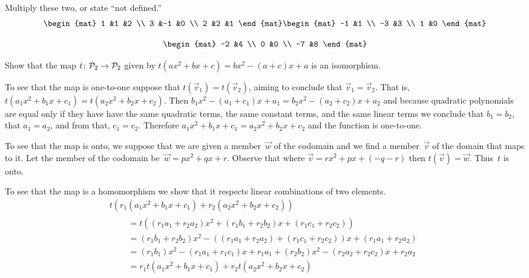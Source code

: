 \documentclass[11pt]{examjh}
\begin{document}
\begin{questions}
\question
Multiply these two, or state ``not defined.''
\begin{equation*}
  \begin{mat}
    1 &1  &2 \\
    3 &-1 &0 \\
    2 &2  &1
  \end{mat}
  \begin{mat}
    -1 &1 \\
    -3 &3 \\
     1 &0
  \end{mat}
\end{equation*}
\begin{solution}[1in]
  \begin{equation*}
    \begin{mat}
      -2 &4 \\
       0 &0 \\
      -7 &8
    \end{mat}
  \end{equation*}
\end{solution}


\question
Show that the map $\mbox{$t\colon \mathcal{P}_2\to \mathcal{P}_2$}$ given by
$t(ax^2+bx+c)=bx^2-(a+c)x+a$ is an isomorphism.
\begin{solution}[2.5in]
To see that the map is one-to-one suppose that $t(\vec{v}_1)=t(\vec{v}_2)$,
aiming to conclude that $\vec{v}_1=\vec{v}_2$.
That is, $t(a_1x^2+b_1x+c_1)=t(a_2x^2+b_2x+c_2)$.
Then $b_1x^2-(a_1+c_1)x+a_1=b_2x^2-(a_2+c_2)x+a_2$ and because 
quadratic polynomials
are equal only if they have have the same quadratic terms, the same constant
terms, and the same linear terms we conclude that 
$b_1=b_2$, that $a_1=a_2$, and from that, $c_1=c_2$.
Therefore $a_1x^2+b_1x+c_1=a_2x^2+b_2x+c_2$ and the function is 
one-to-one.

To see that the map is onto, we suppose that we are given a member~$\vec{w}$ 
of the codomain and we find a member~$\vec{v}$ of the domain that maps to
it.
Let the member of the codomain be~$\vec{w}=px^2+qx+r$.
Observe that where $\vec{v}=rx^2+px+(-q-r)$ then $t(\vec{v})=\vec{w}$.
Thus~$t$ is onto.  

To see that the map is a homomorphism we show that it respects linear 
combinations of two elements.
\begin{multline*}
  t(r_1(a_1x^2+b_1x+c_1)+r_2(a_2x^2+b_2x+c_2))              \\ 
  \begin{split} \quad 
  &=t((r_1a_1+r_2a_2)x^2+(r_1b_1+r_2b_2)x+(r_1c_1+r_2c_2))   \\
  &=(r_1b_1+r_2b_2)x^2-((r_1a_1+r_2a_2)+(r_1c_1+r_2c_2))x+(r_1a_1+r_2a_2)  \\
  &=(r_1b_1)x^2-(r_1a_1+r_1c_1)x+r_1a_1
     +(r_2b_2)x^2-(r_2a_2+r_2c_2)x+r_2a_2                       \\
  &=r_1t(a_1x^2+b_1x+c_1)+r_2t(a_2x^2+b_2x+c_2)
  \end{split}
\end{multline*}
\end{solution}




\end{questions}
\end{document}
